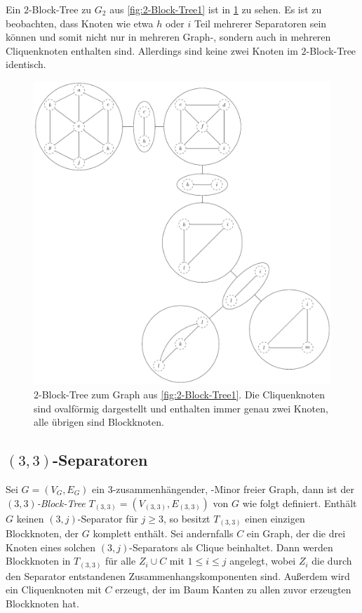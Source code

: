 Ein $2$-Block-Tree zu $G_2$ aus \Abb \ref{fig:2-Block-Tree1} ist in \Abb \ref{fig:2-Block-Tree2} zu sehen.
Es ist zu beobachten, dass Knoten wie etwa $h$ oder $i$ Teil mehrerer Separatoren sein können und somit nicht nur in mehreren Graph-, sondern auch in mehreren Cliquenknoten enthalten sind.
Allerdings sind keine zwei Knoten im $2$-Block-Tree identisch.
\begin{figure}[H]
  \centering
  \includegraphics[width=\textwidth,height=\textheight,keepaspectratio]{bilder/2-Block-Tree2.pdf}
  \caption{$2$-Block-Tree zum Graph aus \Abb \ref{fig:2-Block-Tree1}.
           Die Cliquenknoten sind ovalförmig dargestellt und enthalten immer genau zwei Knoten, alle übrigen sind Blockknoten.}
  \label{fig:2-Block-Tree2}
\end{figure}


\subsection{$(3, 3)$-Separatoren}

\begin{definition}
  Sei $G = (V_G, E_G)$ ein $3$-zusammenhängender, \kf-Minor freier Graph, dann ist der \emph{$(3, 3)$-Block-Tree} $T_{(3, 3)} = (V_{(3, 3)}, E_{(3, 3)})$ von $G$ wie folgt definiert.
  Enthält $G$ keinen $(3, j)$-Separator für $j \geq 3$, so besitzt $T_{(3, 3)}$ einen einzigen Blockknoten, der $G$ komplett enthält.
  Sei andernfalls $C$ ein Graph, der die drei Knoten eines solchen $(3, j)$-Separators als Clique beinhaltet.
  Dann werden Blockknoten in $T_{(3, 3)}$ für alle $Z_i \cup C$ mit $1 \leq i \leq j$ angelegt, wobei $Z_i$ die durch den Separator entstandenen Zusammenhangskomponenten sind.
  Außerdem wird ein Cliquenknoten mit $C$ erzeugt, der im Baum Kanten zu allen zuvor erzeugten Blockknoten hat.
\end{definition}

